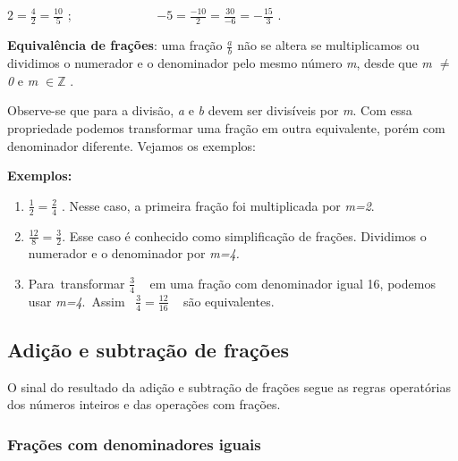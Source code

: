 \begin{justify}
 \( 2=\frac{4}{2}=\frac{10}{5} \) ;~~~~~~~~~~~~~  \( -5=\frac{-10}{2}=\frac{30}{-6}=-\frac{15}{3} \) .
\end{justify}

\textbf{Equivalência de frações}: uma fração  \( \frac{a}{b} \)   não se altera se multiplicamos ou dividimos o numerador e o denominador pelo mesmo número \textit{m}, desde que\textit{ m $ \neq $  0 }e\textit{ m  \(\in \mathbb{Z} \) }.

 \quad {}

\begin{justify}
Observe-se que para a divisão, \textit{a} e \textit{b} devem ser divisíveis por \textit{m}. Com essa propriedade podemos transformar uma fração em outra equivalente, porém com denominador diferente. Vejamos os exemplos:
\end{justify}

\textbf{Exemplos:}

\begin{enumerate}
	\item  \( \frac{1}{2}=\frac{2}{4} \)  . Nesse caso, a primeira fração foi multiplicada por \textit{m=2}.

	\item   \( \frac{12}{8}=\frac{3}{2} \). Esse caso é conhecido como simplificação de frações. Dividimos o numerador e o denominador por \textit{m=4.}

	\item Para~transformar   \( \frac{3}{4} \) ~ em uma fração com denominador igual 16, podemos usar \textit{m=4}.~Assim~   \( \frac{3}{4}=\frac{12}{16} \) ~ são equivalentes.
\end{enumerate}

\subsection{Adição e subtração de frações }

\quad O sinal do resultado da adição e subtração de frações segue as regras operatórias dos números inteiros e das operações com frações.

\quad 
\subsubsection{Frações com denominadores iguais}

